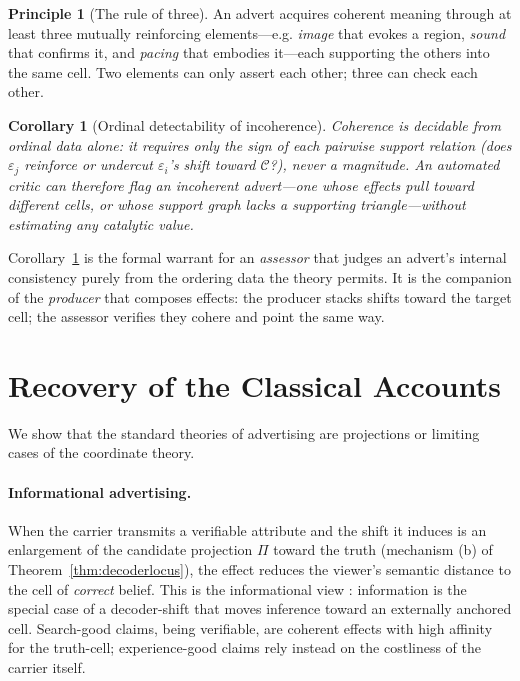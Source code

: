 \documentclass[twocolumn,11pt,a4paper]{article}
\theoremstyle{adv}
\newtheorem{corollary}[theorem]{Corollary}
\theoremstyle{definition}
\newtheorem{principle}[theorem]{Principle}
\theoremstyle{remark}
\newcommand{\Cell}{\mathcal{C}}        %
\newcommand{\Proj}{\Pi}                %
\newcommand{\Eff}{\varepsilon}        %
\begin{document}
\begin{principle}[The rule of three]
\label{prin:three}
An advert acquires coherent meaning through at least three mutually
reinforcing elements---e.g. \emph{image} that evokes a region,
\emph{sound} that confirms it, and \emph{pacing} that embodies it---each
supporting the others into the same cell. Two elements can only assert each
other; three can check each other.
\end{principle}

\begin{corollary}[Ordinal detectability of incoherence]
\label{cor:detect}
Coherence is decidable from ordinal data alone: it requires only the
sign of each pairwise support relation (does $\Eff_j$ reinforce or
undercut $\Eff_i$'s shift toward $\Cell$?), never a magnitude. An automated
critic can therefore flag an incoherent advert---one whose effects pull
toward different cells, or whose support graph lacks a supporting
triangle---without estimating any catalytic value.
\end{corollary}

Corollary~\ref{cor:detect} is the formal warrant for an \emph{assessor}
that judges an advert's internal consistency purely from the ordering data
the theory permits. It is the companion of the \emph{producer} that
composes effects: the producer stacks shifts toward the target cell; the
assessor verifies they cohere and point the same way.

\section{Recovery of the Classical Accounts}
\label{sec:recovery}

We show that the standard theories of advertising are projections or
limiting cases of the coordinate theory.

\paragraph{Informational advertising.}
When the carrier transmits a verifiable attribute and the shift it induces
is an enlargement of the candidate projection $\Proj$ toward the truth
(mechanism (b) of Theorem~\ref{thm:decoderlocus}), the effect reduces the
viewer's semantic distance to the cell of \emph{correct} belief. This is
the informational view \citep{stigler1961,nelson1974}: information is the
special case of a decoder-shift that moves inference toward an externally
anchored cell. Search-good claims, being verifiable, are coherent effects
with high affinity for the truth-cell; experience-good claims rely instead
on the costliness of the carrier itself.
\end{document}
